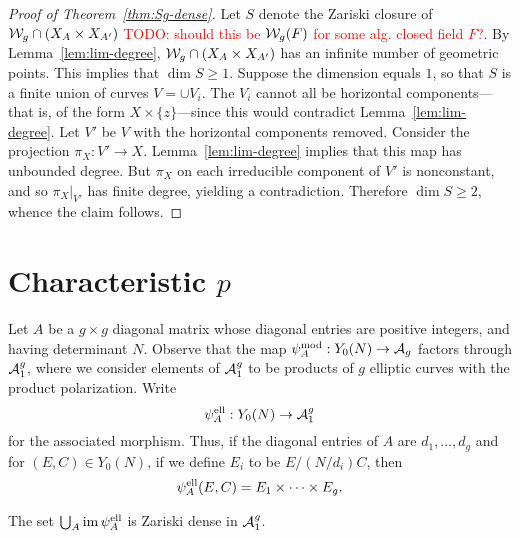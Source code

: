 \documentclass{amsart}
\begin{document}
\begin{proof}[Proof of Theorem~\ref{thm:Sg-dense}]
  Let $S$ denote the Zariski closure of $\mathcal{W}_g \cap (X_A \times X_{A'})$ \textcolor{red}{TODO: should this be $\mathcal{W}_g(F)$ for some alg. closed field $F$?}. By Lemma~\ref{lem:lim-degree}, $\mathcal{W}_g \cap (X_A \times X_{A'})$ has an infinite number of geometric points. This implies that $\dim S \geq 1$. Suppose the dimension equals $1$, so that $S$ is a finite union of curves $V = \cup V_i$. The $V_i$ cannot all be horizontal components---that is, of the form $X \times \{z\}$---since this would contradict Lemma~\ref{lem:lim-degree}. Let $V'$ be $V$ with the horizontal components removed. Consider the projection $\pi_X: V' \to X$. Lemma~\ref{lem:lim-degree} implies that this map has unbounded degree. But $\pi_X$ on each irreducible component of $V'$ is nonconstant, and so $\pi_X|_{V'}$ has finite degree, yielding a contradiction. Therefore $\dim S \geq 2$, whence the claim follows.
\end{proof}







\section{Characteristic $p$}
\label{sec:characteristic-p}

Let $A$ be a $g \times g$ diagonal matrix whose diagonal entries are positive integers, and having determinant $N$. Observe that the map $\psi_{A}^\mathrm{mod}: Y_0(N) \to \mathcal{A}_g$ factors through $\mathcal{A}_1^g$, where we consider elements of $\mathcal{A}_1^g$ to be products of $g$ elliptic curves with the product polarization. Write
\[
\psi_{A}^\mathrm{ell}: Y_0(N) \to \mathcal{A}_1^g
\]
for the associated morphism. Thus, if the diagonal entries of $A$ are $d_1, \ldots, d_g$ and for $(E, C) \in Y_0(N)$, if we define $E_i$ to be $E/(N/d_i)C$, then
\[
  \psi_{A}^\mathrm{ell}(E,C) = E_1 \times \cdots \times E_g.
\]

\begin{theorem}\label{thm:char-p-version}
  The set $\bigcup_A \operatorname{im}\psi_{A}^\mathrm{ell}$ is Zariski dense in $\mathcal{A}_1^g$.
\end{theorem}
\end{document}
